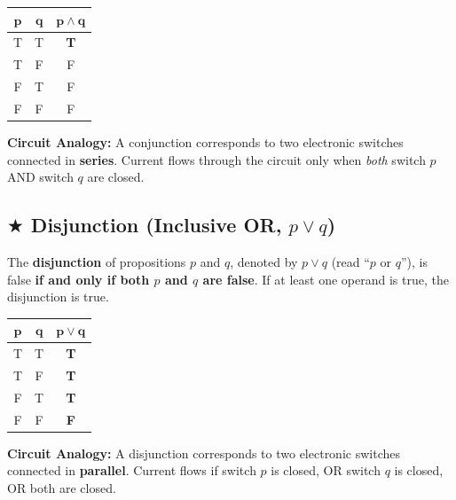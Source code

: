 \documentclass[11pt,a4paper]{article}
\begin{document}
\begin{center}
\renewcommand{\arraystretch}{1.2}
\begin{tabular}{|c|c|c|}
\hline
\rowcolor{navy!15} $\mathbf{p}$ & $\mathbf{q}$ & $\mathbf{p \wedge q}$ \\
\hline
T & T & \textbf{T} \\
T & F & F \\
F & T & F \\
F & F & F \\
\hline
\end{tabular}
\quad
\begin{minipage}{0.65\textwidth}
\small
\textbf{Circuit Analogy:} A conjunction corresponds to two electronic switches connected in \textbf{series}. Current flows through the circuit only when \textit{both} switch $p$ AND switch $q$ are closed.
\end{minipage}
\end{center}

\subsection{\texorpdfstring{$\bigstar$ }{*}Disjunction (Inclusive OR, \texorpdfstring{$p \vee q$}{p or q})}
\begin{defbox}[Disjunction]
The \textbf{disjunction} of propositions $p$ and $q$, denoted by $p \vee q$ (read ``$p$ or $q$''), is false \textbf{if and only if both $p$ and $q$ are false}. If at least one operand is true, the disjunction is true.
\end{defbox}

\begin{center}
\renewcommand{\arraystretch}{1.2}
\begin{tabular}{|c|c|c|}
\hline
\rowcolor{navy!15} $\mathbf{p}$ & $\mathbf{q}$ & $\mathbf{p \vee q}$ \\
\hline
T & T & \textbf{T} \\
T & F & \textbf{T} \\
F & T & \textbf{T} \\
F & F & \textbf{F} \\
\hline
\end{tabular}
\quad
\begin{minipage}{0.65\textwidth}
\small
\textbf{Circuit Analogy:} A disjunction corresponds to two electronic switches connected in \textbf{parallel}. Current flows if switch $p$ is closed, OR switch $q$ is closed, OR both are closed.
\end{minipage}
\end{center}
\end{document}
